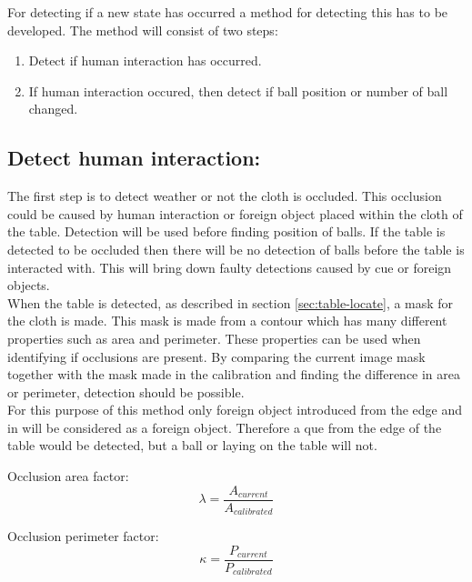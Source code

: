 For detecting if a new state has occurred a method for detecting this has to be developed. The method will consist of two steps:

\begin{enumerate}
	\item Detect if human interaction has occurred.
	\item If human interaction occured, then detect if ball position or number of ball changed.
\end{enumerate}


\subsection{Detect human interaction:}
The first step is to detect weather or not the cloth is occluded. This occlusion could be caused by human interaction or foreign object placed within the cloth of the table. Detection will be used before finding position of balls. If the table is detected to be occluded then there will be no detection of balls before the table is interacted with. This will bring down faulty detections caused by cue or foreign objects.\\

When the table is detected, as described in section \ref{sec:table-locate}, a mask for the cloth is made. This mask is made from a contour which has many different properties such as area and perimeter. These properties can be used when identifying if occlusions are present. By comparing the current image mask together with the mask made in the calibration and finding the difference in area or perimeter, detection should be possible.\\

For this purpose of this method only foreign object introduced from the edge and in will be considered as a foreign object. Therefore a que from the edge of the table would be detected, but a ball or laying on the table will not.

Occlusion area factor:
\begin{equation}
\lambda = \frac{A_{current}}{A_{calibrated}}
\label{eq:area}
\end{equation}

Occlusion perimeter factor:
\begin{equation}
\kappa = \frac{P_{current}}{P_{calibrated}}
\label{eq:perimeter}
\end{equation}

